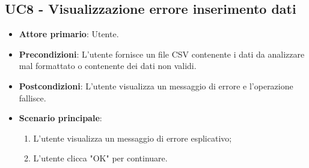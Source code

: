 \subsection{UC8 - Visualizzazione errore inserimento dati}
\begin{itemize}
	\item \textbf{Attore primario}: Utente.
	\item \textbf{Precondizioni}: L'utente fornisce un file CSV contenente i dati da analizzare mal formattato o contenente dei dati non validi.
	\item \textbf{Postcondizioni}: L'utente visualizza un messaggio di errore e l'operazione fallisce.
	\item \textbf{Scenario principale}:
		\begin{enumerate}
			\item L'utente visualizza un messaggio di errore esplicativo;
			\item L'utente clicca "OK" per continuare.
		\end{enumerate}
\end{itemize}